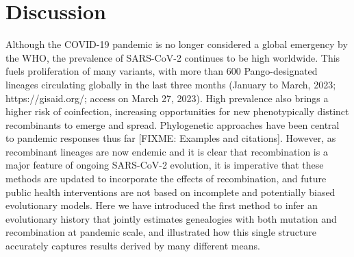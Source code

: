\documentclass{article}
\begin{document}
\section{Discussion}
Although the COVID-19 pandemic is no longer considered a global emergency
by the WHO, the prevalence of SARS-CoV-2 continues to be high worldwide. This fuels 
proliferation of many variants, with more than 600 Pango-designated lineages
circulating globally in the last three months (January to March, 2023;
https://gisaid.org/; access on March 27, 2023). High prevalence also brings a
higher risk of coinfection, increasing opportunities for new phenotypically
distinct recombinants to emerge and spread. Phylogenetic approaches have
been central to pandemic responses thus far [FIXME: Examples and citations].
However, as recombinant lineages are now endemic and it is clear that
recombination is a major feature of ongoing SARS-CoV-2 evolution,
it is imperative that these methods are updated to incorporate the
effects of recombination, and future public health interventions are
not based on incomplete and potentially biased evolutionary models.
Here we have introduced the first method to infer an evolutionary
history that jointly estimates genealogies with both mutation and
recombination at pandemic scale, and illustrated how this single
structure accurately captures results derived by many different means.
\end{document}

